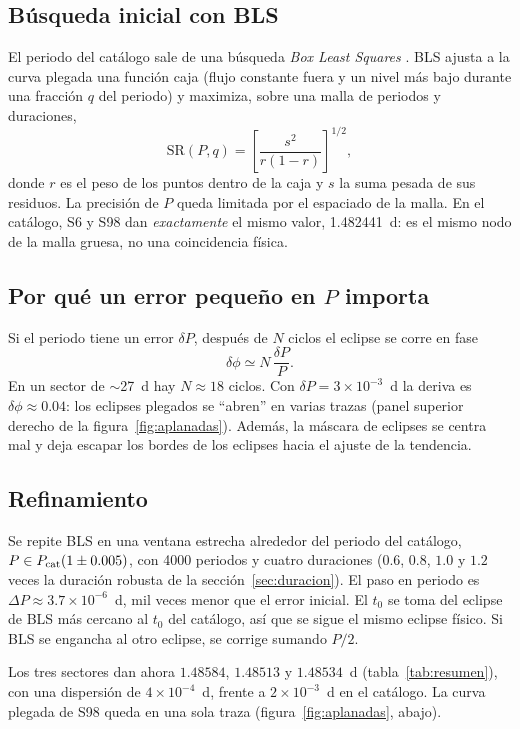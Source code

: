 \documentclass[11pt,a4paper]{article}
\begin{document}
\subsection{Búsqueda inicial con BLS}
El periodo del catálogo sale de una búsqueda \emph{Box Least Squares} \citep[BLS;][]{Kovacs2002}.
BLS ajusta a la curva plegada una función caja (flujo constante fuera y un nivel más bajo
durante una fracción $q$ del periodo) y maximiza, sobre una malla de periodos y duraciones,
\begin{equation}
\mathrm{SR}(P,q)=\left[\frac{s^2}{r(1-r)}\right]^{1/2},
\end{equation}
donde $r$ es el peso de los puntos dentro de la caja y $s$ la suma pesada de sus residuos. La
precisión de $P$ queda limitada por el espaciado de la malla. En el catálogo, S6 y S98 dan
\emph{exactamente} el mismo valor, 1.482441~d: es el mismo nodo de la malla gruesa, no una
coincidencia física.

\subsection{Por qué un error pequeño en $P$ importa}
Si el periodo tiene un error $\delta P$, después de $N$ ciclos el eclipse se corre en fase
\begin{equation}
\delta\phi \simeq N\,\frac{\delta P}{P}.
\label{eq:deriva}
\end{equation}
En un sector de $\sim$27~d hay $N\approx18$ ciclos. Con $\delta P=3\times10^{-3}$~d la deriva es
$\delta\phi\approx0.04$: los eclipses plegados se ``abren'' en varias trazas (panel superior
derecho de la figura~\ref{fig:aplanadas}). Además, la máscara de eclipses se centra mal y deja
escapar los bordes de los eclipses hacia el ajuste de la tendencia.

\subsection{Refinamiento}
Se repite BLS en una ventana estrecha alrededor del periodo del catálogo,
$P\in P_{\rm cat}(1\pm0.005)$, con 4000 periodos y cuatro duraciones
($0.6$, $0.8$, $1.0$ y $1.2$ veces la duración robusta de la sección~\ref{sec:duracion}). El paso
en periodo es $\Delta P\approx3.7\times10^{-6}$~d, mil veces menor que el error inicial. El
$t_0$ se toma del eclipse de BLS más cercano al $t_0$ del catálogo, así que se sigue el mismo
eclipse físico. Si BLS se engancha al otro eclipse, se corrige sumando $P/2$.

Los tres sectores dan ahora $1.48584$, $1.48513$ y $1.48534$~d (tabla~\ref{tab:resumen}), con
una dispersión de $4\times10^{-4}$~d, frente a $2\times10^{-3}$~d en el catálogo. La curva plegada
de S98 queda en una sola traza (figura~\ref{fig:aplanadas}, abajo).
\end{document}
